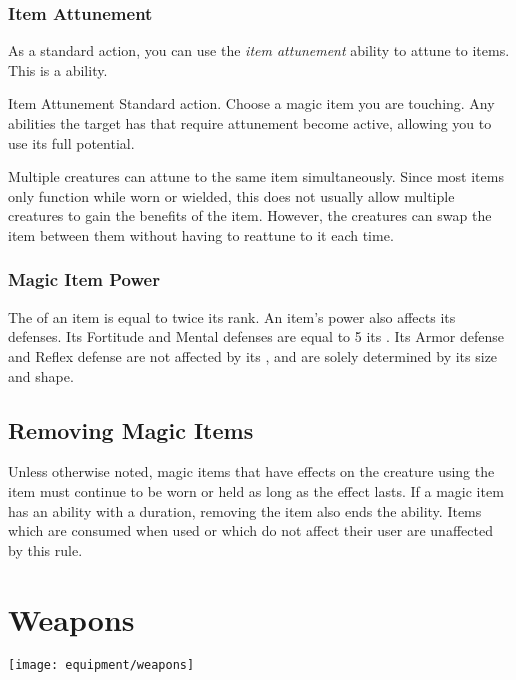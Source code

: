    \subsubsection{Item Attunement}\label{Item Attunement}

      As a standard action, you can use the \textit{item attunement} ability to attune to items.
      This is a \magical ability.

      \begin{attuneability}{Item Attunement}{}
        \abilityusagetime Standard action.
        \rankline
        Choose a magic item you are touching.
        Any abilities the target has that require attunement become active, allowing you to use its full potential.
      \end{attuneability}

       Multiple creatures can attune to the same item simultaneously.
      Since most items only function while worn or wielded, this does not usually allow multiple creatures to gain the benefits of the item.
      However, the creatures can swap the item between them without having to reattune to it each time.

    \subsubsection{Magic Item Power}\label{Magic Item Power}
      The  of an item is equal to twice its rank.
      An item's power also affects its defenses.
      Its Fortitude and Mental defenses are equal to 5 \add its .
      Its Armor defense and Reflex defense are not affected by its , and are solely determined by its size and shape.

  \subsection{Removing Magic Items}
    Unless otherwise noted, magic items that have effects on the creature using the item must continue to be worn or held as long as the effect lasts.
    If a magic item has an ability with a duration, removing the item also ends the ability.
    Items which are consumed when used or which do not affect their user are unaffected by this rule.

    \newpage
\section{Weapons}\label{Weapons}
  \texttt{[image: equipment/weapons]}

